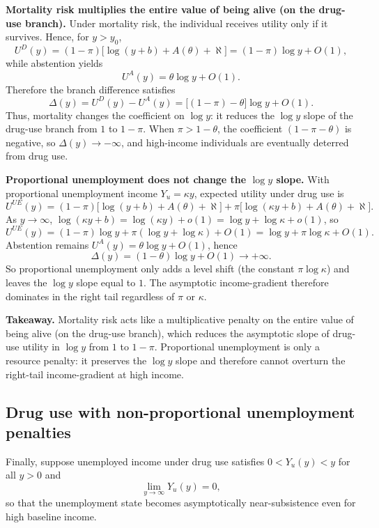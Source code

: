\medskip
\noindent\textbf{Mortality risk multiplies the entire value of being alive (on the drug-use branch).}
Under mortality risk, the individual receives utility only if it survives. Hence, for $y>y_0$,
\[
U^{D}(y)=(1-\pi)\big[\log(y+b)+A(\theta)+\aleph\big]=(1-\pi)\log y + O(1),
\]
while abstention yields
\[
U^{A}(y)=\theta\log y + O(1).
\]
Therefore the branch difference satisfies
\[
\Delta(y)=U^{D}(y)-U^{A}(y)=\big[(1-\pi)-\theta\big]\log y + O(1).
\]
Thus, mortality changes the coefficient on $\log y$: it reduces the $\log y$ slope of the drug-use branch from $1$ to $1-\pi$. When $\pi>1-\theta$, the coefficient $(1-\pi-\theta)$ is negative, so $\Delta(y)\to -\infty$, and high-income individuals are eventually deterred from drug use.

\medskip
\noindent\textbf{Proportional unemployment does not change the $\log y$ slope.}
With proportional unemployment income $Y_u=\kappa y$, expected utility under drug use is
\[
U^{UE}(y)= (1-\pi)\big[\log(y+b)+A(\theta)+\aleph\big]+\pi\big[\log(\kappa y+b)+A(\theta)+\aleph\big].
\]
As $y\to\infty$, $\log(\kappa y+b)=\log(\kappa y)+o(1)=\log y+\log\kappa+o(1)$, so
\[
U^{UE}(y)=(1-\pi)\log y+\pi(\log y+\log\kappa)+O(1)=\log y+\pi\log\kappa+O(1).
\]
Abstention remains $U^{A}(y)=\theta\log y+O(1)$, hence
\[
\Delta(y)=(1-\theta)\log y + O(1)\to +\infty.
\]
So proportional unemployment only adds a level shift (the constant $\pi\log\kappa$) and leaves the
$\log y$ slope equal to $1$. The asymptotic income-gradient therefore dominates in the right tail regardless of $\pi$ or $\kappa$.

\medskip
\noindent\textbf{Takeaway.}
Mortality risk acts like a multiplicative penalty on the entire value of being alive (on the drug-use branch), which reduces the
asymptotic slope of drug-use utility in $\log y$ from $1$ to $1-\pi$. Proportional unemployment is only a
resource penalty: it preserves the $\log y$ slope and therefore cannot overturn the right-tail income-gradient at high income.

\subsection{Drug use with non-proportional unemployment penalties}

Finally, suppose unemployed income under drug use satisfies
$0<Y_u(y)<y$ for all $y>0$ and
\[
\lim_{y\to\infty} Y_u(y)=0,
\]
so that the unemployment state becomes asymptotically near-subsistence even for high baseline income.

